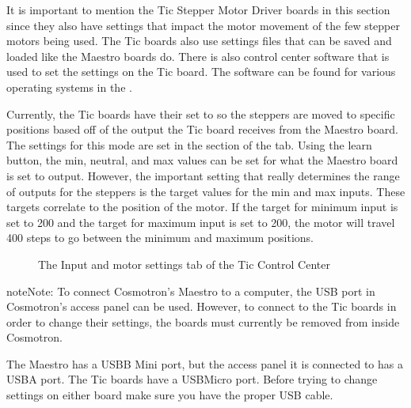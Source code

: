 \documentclass[letterpaper,10pt,english]{sphinxmanual}
\begin{document}
\sphinxAtStartPar
{}

\sphinxAtStartPar
It is important to mention the Tic Stepper Motor Driver boards in this section
since they also have settings that impact the motor movement of the few stepper
motors being used. The Tic boards also use settings files that can be saved and
loaded like the Maestro boards do. There is also control center software that is
used to set the settings on the Tic board. The software can be found for various
operating systems in the .

\sphinxAtStartPar
Currently, the Tic boards have their  set to 
so the steppers are moved to specific positions based off of the output the Tic
board receives from the Maestro board. The settings for this mode are set in the
 section of the  tab. Using the
learn button, the min, neutral, and max values can be set for what the Maestro
board is set to output. However, the important setting that really determines the
range of outputs for the steppers is the target values for the min and max inputs.
These targets correlate to the position of the motor. If the target for minimum
input is set to \sphinxhyphen{}200 and the target for maximum input is set to 200, the motor will
travel 400 steps to go between the minimum and maximum positions.

\begin{figure}[htbp]
\centering
\capstart

\noindent{}
\caption{The Input and motor settings tab of the Tic Control Center}\label{\detokenize{range:id2}}\end{figure}

\begin{sphinxadmonition}{note}{Note:}
\sphinxAtStartPar
To connect Cosmotron’s Maestro to a computer, the USB port in Cosmotron’s
access panel can be used. However, to connect to the Tic boards in order to
change their settings, the boards must currently be removed from inside
Cosmotron.

\sphinxAtStartPar
The Maestro has a USB\sphinxhyphen{}B Mini port, but the access panel it is connected to
has a USB\sphinxhyphen{}A port. The Tic boards have a USB\sphinxhyphen{}Micro port. Before trying to change
settings on either board make sure you have the proper USB cable.
\end{sphinxadmonition}
\end{document}
